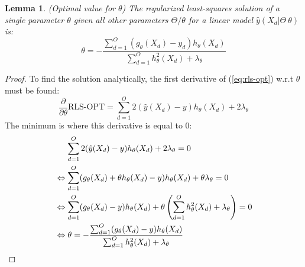 \documentclass[10pt]{journal}
\newtheorem{lemma}{Lemma}
\newtheorem{proof}{Proof}
\begin{document}
\begin{lemma}
    (Optimal value for $\theta$) The regularized least-squares solution of a
    single parameter $\theta$ given all other parameters $\Theta / {\theta}$ for
    a linear model $\hat{y}(X_d| \Theta \ {\theta})$ is:
    \begin{equation}
        \theta = - \frac{ \sum_{d=1}^{O} (g_\theta(X_d) - y_d) h_\theta(X_d) }
                        { \sum_{d=1}^{O} h^2_\theta(X_d) + \lambda_\theta }
    \end{equation}
\end{lemma}

\begin{proof}
    To find the solution analytically, the first derivative of
    (\ref{eq:rls-opt}) w.r.t $\theta$ must be found:
    \begin{equation} \label{eq:rls-opt-derivative}
        \frac{ \partial }{ \partial\theta } \text{RLS-OPT} =
            \sum_{d=1}^{O} 2(\hat{y}(X_d) - y) h_\theta(X_d) + 2\lambda_\theta
    \end{equation}
    The minimum is where this derivative is equal to 0:
    \begin{align}
        & \hphantom{==} \begin{aligned}[t]
            \sum_{d=1}^{O} 2(\hat{y}(X_d) - y) h_\theta(X_d) +
                2\lambda_\theta = 0
        \end{aligned} \\
        & \Leftrightarrow \begin{aligned}[t]
            \sum_{d=1}^{O}
                (g_\theta(X_d) + \theta h_\theta(X_d) - y) h_\theta(X_d) +
            \theta\lambda_\theta = 0
        \end{aligned} \\
        & \Leftrightarrow \begin{aligned}[t]
            \sum_{d=1}^{O}
                (g_\theta(X_d) - y) h_\theta(X_d) +
            \theta\left(
                \sum_{d=1}^{O} h^2_\theta(X_d) + \lambda_\theta
            \right) = 0
        \end{aligned} \\
        & \Leftrightarrow \begin{aligned}[t]
            \theta = -\frac{\sum_{d=1}^{O} (g_\theta(X_d) - y) h_\theta(X_d)}
                           {\sum_{d=1}^{O} h^2_\theta(X_d) + \lambda_\theta}
        \end{aligned}
    \end{align}
\end{proof}
\end{document}
